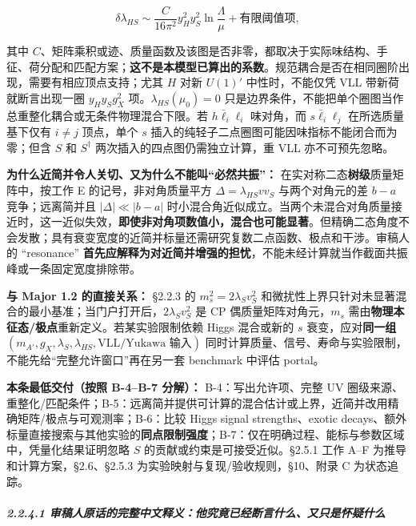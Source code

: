 \documentclass[
]{article}
\begin{document}
\[
\delta\lambda_{HS}\sim \frac{C}{16\pi^2}y_H^2y_S^2\ln\frac{\Lambda}{\mu}
+\text{有限阈值项},
\]

其中
\(C\)、矩阵乘积或迹、质量函数及该图是否非零，都取决于实际味结构、手征、荷分配和匹配方案；\textbf{这不是本模型已算出的系数}。规范耦合是否在相同圈阶出现，需要有相应顶点支持；尤其
\(H\) 对新 \(U(1)'\) 中性时，不能仅凭 VLL 带新荷就断言出现一圈
\(y_Hy_Sg_X^2\) 项。\(\lambda_{HS}(\mu_0)=0\)
只是边界条件，不能把单个圈图当作总重整化耦合或无条件物理混合下限。若
\(h\bar\ell_i\ell_i\) 味对角，而 \(s\bar\ell_i\ell_j\)
在所选质量基下仅有 \(i\ne j\) 顶点，单个 \(s\)
插入的纯轻子二点圈图可能因味指标不能闭合而为零；但含 \(S\) 和
\(S^\dagger\) 两次插入的四点图仍需独立计算，重 VLL 亦不可预先忽略。

\textbf{为什么近简并令人关切、又为什么不能叫``必然共振''：}
在实对称二态\textbf{树级}质量矩阵中，按工作 E 的记号，非对角质量平方
\(\Delta=\lambda_{HS}vv_S\) 与两个对角元的差 \(b-a\) 竞争；远离简并且
\(|\Delta|\ll|b-a|\)
时小混合角近似成立。当两个未混合对角质量接近时，这一近似失效，\textbf{即使非对角项数值小，混合也可能显著}。但精确二态角度不会发散；具有衰变宽度的近简并标量还需研究复数二点函数、极点和干涉。审稿人的
``resonance''
\textbf{首先应解释为对近简并增强的担忧}，不能未经计算就当作截面共振峰或一条固定宽度排除带。

\textbf{与 Major 1.2 的直接关系：} §2.2.3 的 \(m_s^2=2\lambda_Sv_S^2\)
和微扰性上界只针对未显著混合的最小基准；当门户打开后，\(2\lambda_Sv_S^2\)
是 CP 偶质量矩阵对角元，\(m_s\)
需由\textbf{物理本征态/极点}重新定义。若某实验限制依赖 Higgs 混合或新的
\(s\) 衰变，应对\textbf{同一组}
\((m_{A'},g_X,\lambda_S,\lambda_{HS},\text{VLL/Yukawa 输入})\)
同时计算质量、信号、寿命与实验限制，不能先给``完整允许窗口''再在另一套
benchmark 中评估 portal。

\textbf{本条最低交付（按照 B-4--B-7 分解）：} B-4：写出允许项、完整 UV
圈级来源、重整化/匹配条件；B-5：远离简并提供可计算的混合估计或上界，近简并改用精确矩阵/极点与可观测率；B-6：比较
Higgs signal strengths、exotic
decays、额外标量直接搜索与其他实验的\textbf{同点限制强度}；B-7：仅在明确过程、能标与参数区域中，凭量化结果证明忽略
\(S\) 的贡献或约束是可接受近似。§2.5.1 工作 A--F
为推导和计算方案，§2.6、§2.5.3 为实验映射与复现/验收规则，§10、附录 C
为状态追踪。

\subparagraph{2.2.4.1
审稿人原话的完整中文释义：他究竟已经断言什么、又只是怀疑什么}\label{ux5ba1ux7a3fux4ebaux539fux8bddux7684ux5b8cux6574ux4e2dux6587ux91caux4e49ux4ed6ux7a76ux7adfux5df2ux7ecfux65adux8a00ux4ec0ux4e48ux53c8ux53eaux662fux6000ux7591ux4ec0ux4e48}
\end{document}
